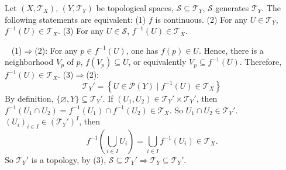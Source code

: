 \begin{propositionenv}
    Let $\left(X,\mathscr{T}_X\right)$, $\left(Y,\mathscr{T}_Y\right)$ be topological spaces, $\mathcal{S}\subseteq\mathscr{T}_Y$, $\mathcal{S}$ generates $\mathscr{T}_Y$. The following statements are equivalent:
    \newline
    (1) $f$ is continuous.
    \newline
    (2) For any $U\in \mathscr{T}_Y$, $f^{-1}(U)\in \mathscr{T}_X$.
    \newline
    (3) For any $U\in \mathcal{S}$, $f^{-1}(U)\in \mathscr{T}_X$.
\end{propositionenv}
\begin{proofenv}
    \ \newline
    (1)$\Rightarrow$(2): For any $p\in f^{-1}(U)$, one has $f(p)\in U$. Hence, there is a neighborhood $V_p$ of $p$, $f(V_p)\subseteq U$, or equivalently $V_p\subseteq f^{-1}(U)$. Therefore, $f^{-1}(U)\in \mathscr{T}_X$.
    \newline
    (3)$\Rightarrow$(2): 
    $$\mathscr{T}_{Y}'=\left\{U\in \mathscr{P}(Y)\mid f^{-1}(U)\in\mathscr{T}_X\right\}$$
    By definition, $\{\varnothing, Y\}\subseteq \mathscr{T}_{Y}'$. If $(U_1,U_2)\in \mathscr{T}_Y'\times\mathscr{T}_Y'$, then $f^{-1}(U_1\cap U_2)=f^{-1}(U_1)\cap f^{-1}(U_2)\in\mathscr{T}_X$. So $U_1\cap U_2\in \mathscr{T}_Y'$. $(U_i)_{i\in I}\in\left(\mathscr{T}_{Y}'\right)^I$, then 
    $$f^{-1}\left(\bigcup_{i\in I}U_i\right)=\bigcup_{i\in I}f^{-1}(U_i)\in \mathscr{T}_X.$$
    So $\mathscr{T}_Y'$ is a topology, by (3), $\mathcal{S}\subseteq \mathscr{T}_Y'\Rightarrow\mathscr{T}_Y\subseteq \mathscr{T}_Y'$.
\end{proofenv}



